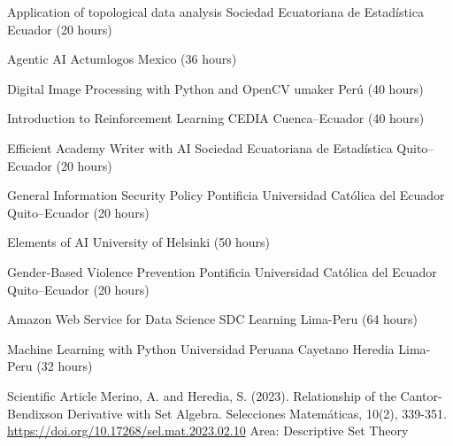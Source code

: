 \documentclass[
    a4paper,
    maincolor=cvblue!70!blue,
    sidecolor=gray!30,
    sectioncolor=cvblue!70!blue,
    sidebarwidth=7.5cm,
    topbottommargin=20pt,
    leftrightmargin=20pt,
]{fortysecondscv}
\begin{document}

    {Application of topological data analysis}
    {Sociedad Ecuatoriana de Estadística}
    {Ecuador (20 hours)}

    {Agentic AI}
    {Actumlogos}
    {Mexico (36 hours)}

    {Digital Image Processing with Python and OpenCV}
    {umaker}
    {Perú (40 hours)}

    {Introduction to Reinforcement Learning}
    {CEDIA}
    {Cuenca–Ecuador (40 hours)}

    {Efficient Academy Writer with AI}
    {Sociedad Ecuatoriana de Estadística}
    {Quito–Ecuador (20 hours)}

    {General Information Security Policy}
    {Pontificia Universidad Católica del Ecuador}
    {Quito–Ecuador (20 hours)}

    {Elements of AI}
    {University of Helsinki}
    {(50 hours)}

    {Gender-Based Violence Prevention}
    {Pontificia Universidad Católica del Ecuador}
    {Quito–Ecuador (20 hours)}

    {Amazon Web Service for Data Science}
    {SDC Learning}
    {Lima-Peru (64 hours)}

    {Machine Learning with Python}
    {Universidad Peruana Cayetano Heredia}
    {Lima-Peru (32 hours)}




    {Scientific Article}
    {Merino, A. and Heredia, S. (2023). Relationship of the Cantor-Bendixson Derivative with Set Algebra. Selecciones Matemáticas, 10(2), 339-351.}
    {\url{https://doi.org/10.17268/sel.mat.2023.02.10}}
    {Area: Descriptive Set Theory}
    
\end{document}
